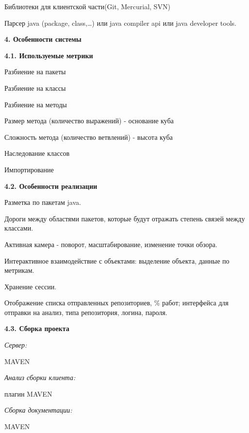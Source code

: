 \documentclass[a4paper,12pt]{article}
\begin{document}
		Библиотеки для клиентской части(Git, Mercurial, SVN)
	
		Парсер java (package, class,…) или java compiler api или java developer tools.
		
\maketitle
\newpage
\textbf{4. Особенности системы}
\newline

	\textbf{4.1.	Используемые метрики}
	\newline
	
	Разбиение на пакеты
	
	Разбиение на классы
	
	Разбиение на методы
	
	Размер метода (количество выражений) - основание куба
	
	Сложность метода (количество ветвлений) - высота куба
	
	Наследование классов
	
	Импортирование
	\newline
	
	\textbf{4.2.	Особенности реализации}
	\newline
	
		Разметка по пакетам java.
		
		Дороги между областями пакетов, которые будут отражать степень связей между классами.
		
		Активная камера - поворот, масштабирование, изменение точки обзора.
		
		Интерактивное взаимодействие с объектами: выделение объекта, данные по метрикам.

		Хранение сессии.

		Отображение списка отправленных репозиториев, \% работ; интерфейса для отправки на анализ, типа репозитория, логина, пароля.
		\newline
		
	\textbf{4.3.	Сборка проекта}
	\newline
	
	\textit{Сервер:}
	
	MAVEN
	\newline
	
	\textit{Анализ сборки клиента:}
	
	плагин MAVEN
	\newline
	
	\textit{Сборка документации:}
	
	MAVEN
\end{document}
